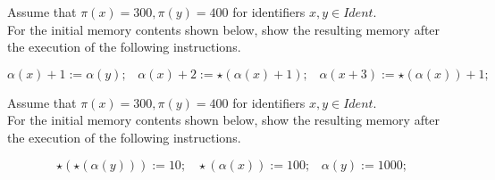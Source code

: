 \begin{example}
Assume that $\pi(x) = 300, \pi(y) = 400$ for identifiers $x,y \in Ident$. \\
For the initial memory contents shown below, show the resulting memory 
after the execution of the following instructions.

$$\alpha(x) + 1 := \alpha(y); \;\;\;
\alpha(x)+2 := \star(\alpha(x)+1); \;\;\;
\alpha(x+3) := \star(\alpha(x))+1;$$

\end{example}

\frmrule

\begin{example}
Assume that $\pi(x) = 300, \pi(y) = 400$ for identifiers $x,y \in Ident$. \\
For the initial memory contents shown below, show the resulting memory 
after the execution of the following instructions.

$$
\star(\star(\alpha(y))) := 10; \;\;\;
\star(\alpha(x)) := 100; \;\;\;
\alpha(y) := 1000;
$$

\end{example}

